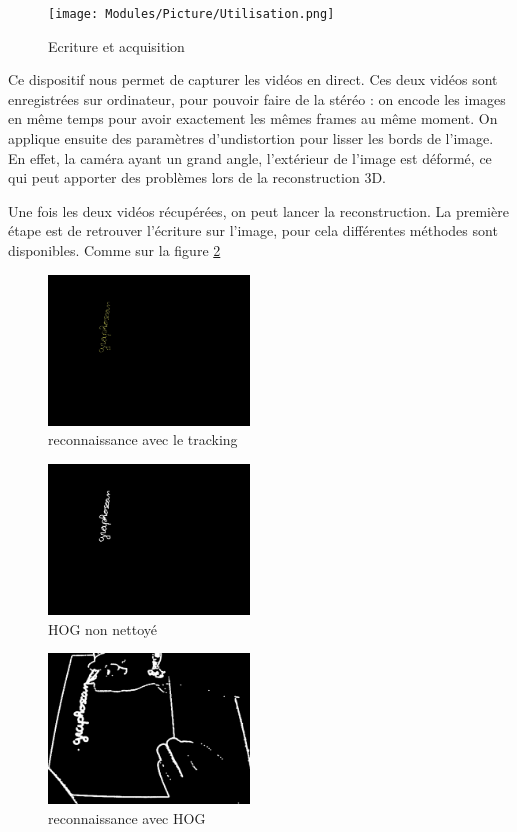 
\begin{figure}[!h]
\centering
\texttt{[image: Modules/Picture/Utilisation.png]}
\caption{Ecriture et acquisition}
\label{utilisation}
\end{figure}

Ce dispositif nous permet de capturer les vidéos en direct. Ces deux vidéos sont enregistrées sur ordinateur, pour pouvoir faire de la stéréo : on encode les images en même temps pour avoir exactement les mêmes frames au même moment. On applique ensuite des paramètres d'undistortion pour lisser les bords de l'image. En effet, la caméra ayant un grand angle, l'extérieur de l'image est déformé, ce qui peut apporter des problèmes lors de la reconstruction 3D.

Une fois les deux vidéos récupérées, on peut lancer la reconstruction. La première étape est de retrouver l'écriture sur l'image, pour cela différentes méthodes sont disponibles. Comme sur la figure \ref{tracking}

\begin{figure}[!h]
\centering
\includegraphics[width=\textwidth, height=4cm]{Modules/Picture/tracking.png}
\caption{reconnaissance avec le tracking}
\label{tracking}
\end{figure}

\begin{figure}[!h]
\centering
\includegraphics[width=\textwidth, height=4cm]{Modules/Picture/hog_propre.png}
\caption{HOG non nettoyé}
\label{HOGSale}
\end{figure}

\begin{figure}[!h]
\centering
\includegraphics[width=\textwidth, height=4cm]{Modules/Picture/hog.png}
\caption{reconnaissance avec HOG}
\label{HOGPropre}
\end{figure}